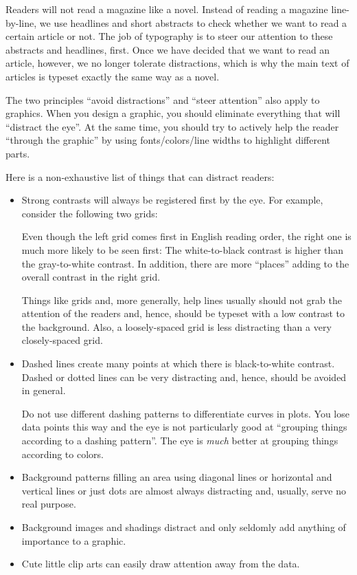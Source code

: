 Readers will not read a magazine like a novel. Instead of reading a magazine
line-by-line, we use headlines and short abstracts to check whether we want to
read a certain article or not. The job of typography is to steer our attention
to these abstracts and headlines, first. Once we have decided that we want to
read an article, however, we no longer tolerate distractions, which is why the
main text of articles is typeset exactly the same way as a novel.

The two principles ``avoid distractions'' and ``steer attention'' also apply to
graphics. When you design a graphic, you should eliminate everything that will
``distract the eye''. At the same time, you should try to actively help the
reader ``through the graphic'' by using fonts/colors/line widths to highlight
different parts.

Here is a non-exhaustive list of things that can distract readers:
%
\begin{itemize}
    \item Strong contrasts will always be registered first by the eye. For
        example, consider the following two grids:

        \medskip\par

        \medskip
        Even though the left grid comes first in English reading order, the
        right one is much more likely to be seen first: The white-to-black
        contrast is higher than the gray-to-white contrast. In addition,
        there are more ``places'' adding to the overall contrast in the right
        grid.

        Things like grids and, more generally, help lines usually should not
        grab the attention of the readers and, hence, should be typeset with
        a low contrast to the background. Also, a loosely-spaced grid is less
        distracting than a very closely-spaced grid.
    \item Dashed lines create many points at which there is black-to-white
        contrast. Dashed or dotted lines can be very distracting and, hence,
        should be avoided in general.

        Do not use different dashing patterns to differentiate curves in
        plots. You lose data points this way and the eye is not particularly
        good at ``grouping things according to a dashing pattern''. The eye
        is \emph{much} better at grouping things according to colors.
    \item Background patterns filling an area using  diagonal lines or
        horizontal and vertical lines or just dots are almost always
        distracting and, usually, serve no real purpose.
    \item Background images and shadings distract and only seldomly add
        anything of importance to a graphic.
    \item Cute little clip arts can easily draw attention away from the data.
\end{itemize}
